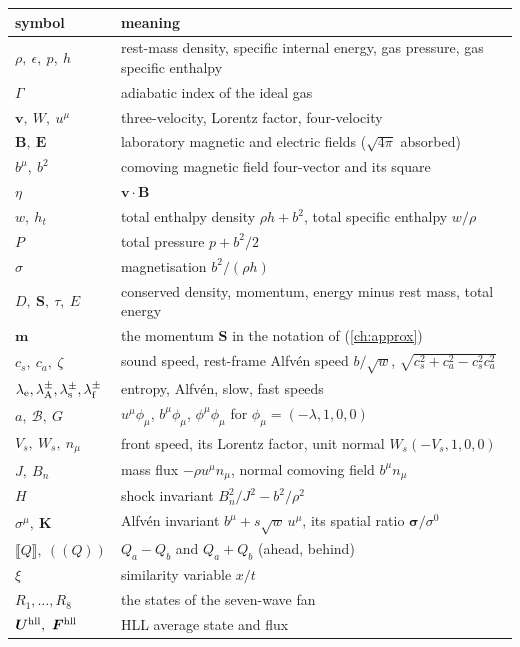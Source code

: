 \documentclass[11pt,a4paper,oneside,openany]{book}
\newcommand{\textcite}{\citet}
\theoremstyle{definition}
\theoremstyle{plain}
\theoremstyle{remark}
\newcommand{\jump}[1]{\llbracket #1\rrbracket}
\newcommand{\avg}[1]{(\!(#1)\!)}
\newcommand{\vv}{\bm{v}}
\newcommand{\BB}{\bm{B}}
\newcommand{\EE}{\bm{E}}
\newcommand{\SSS}{\bm{S}}
\newcommand{\UU}{\bm{U}}
\newcommand{\FF}{\bm{F}}
\newcommand{\calB}{\mathcal{B}}
\newcommand{\Ptot}{P}
\newcommand{\vB}{\eta}
\begin{document}
\begin{center}
\small
\begin{tabular}{@{}ll@{}}
\toprule
symbol & meaning\\
\midrule
$\rho,\ \epsilon,\ p,\ h$ & rest-mass density, specific internal energy, gas pressure, gas specific enthalpy\\
$\Gamma$ & adiabatic index of the ideal gas\\
$\vv,\ W,\ u^\mu$ & three-velocity, Lorentz factor, four-velocity\\
$\BB,\ \EE$ & laboratory magnetic and electric fields ($\sqrt{4\pi}$ absorbed)\\
$b^\mu,\ b^2$ & comoving magnetic field four-vector and its square\\
$\vB$ & $\vv\cdot\BB$\\
$w,\ h_t$ & total enthalpy density $\rho h+b^2$, total specific enthalpy $w/\rho$\\
$\Ptot$ & total pressure $p+b^2/2$\\
$\sigma$ & magnetisation $b^2/(\rho h)$\\
$D,\ \SSS,\ \tau,\ E$ & conserved density, momentum, energy minus rest mass, total energy\\
$\bm m$ & the momentum $\SSS$ in the notation of \textcite{MignoneBodo2006} (\cref{ch:approx})\\
$c_s,\ c_a,\ \zeta$ & sound speed, rest-frame Alfvén speed $b/\sqrt w$, $\sqrt{c_s^2+c_a^2-c_s^2c_a^2}$\\
$\lambda_{\rm e},\lambda_{\rm A}^\pm,\lambda_{\rm s}^\pm,\lambda_{\rm f}^\pm$ & entropy, Alfvén, slow, fast speeds\\
$a,\ \calB,\ G$ & $u^\mu\phi_\mu$, $b^\mu\phi_\mu$, $\phi^\mu\phi_\mu$ for $\phi_\mu=(-\lambda,1,0,0)$\\
$V_s,\ W_s,\ n_\mu$ & front speed, its Lorentz factor, unit normal $W_s(-V_s,1,0,0)$\\
$J,\ B_n$ & mass flux $-\rho u^\mu n_\mu$, normal comoving field $b^\mu n_\mu$\\
$H$ & shock invariant $B_n^2/J^2-b^2/\rho^2$\\
$\sigma^\mu,\ \bm K$ & Alfvén invariant $b^\mu+s\sqrt w\,u^\mu$, its spatial ratio $\bm\sigma/\sigma^0$\\
$\jump{Q},\ \avg{Q}$ & $Q_a-Q_b$ and $Q_a+Q_b$ (ahead, behind)\\
$\xi$ & similarity variable $x/t$\\
$R_1,\dots,R_8$ & the states of the seven-wave fan\\
$\UU^{\rm hll},\ \FF^{\rm hll}$ & HLL average state and flux\\
\bottomrule
\end{tabular}
\end{center}
\end{document}
